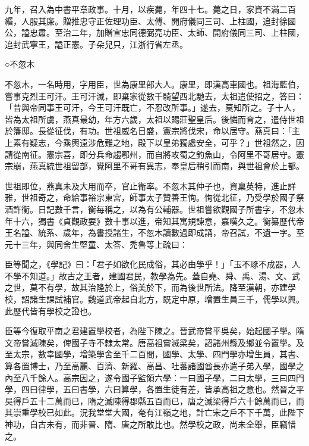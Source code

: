 \begin{pinyinscope}
 九年，召入為中書平章政事。十月，以疾薨，年四十七。薨之日，家資不滿二百緡，人服其廉。贈推忠守正佐理功臣、太傅、開府儀同三司、上柱國，追封徐國公，謚忠肅。至治二年，加贈宣忠同德弼亮功臣、太師、開府儀同三司、上柱國，追封武寧王，謚正憲。子朵兒只，江浙行省左丞。



 ○不忽木



 不忽木，一名時用，字用臣，世為康里部大人。康里，即漢高車國也。祖海藍伯，嘗事克烈王可汗。王可汗滅，即棄家從數千騎望西北馳去，太祖遣使招之，答曰：「昔與帝同事王可汗，今王可汗既亡，不忍改所事。」遂去，莫知所之。子十人，皆為太祖所虜，燕真最幼，年方六歲，太祖以賜莊聖皇后。後憐而育之，遣侍世祖於籓邸。長從征伐，有功。世祖威名日盛，憲宗將伐宋，命以居守。燕真曰：「主上素有疑志，今乘輿遠涉危難之地，殿下以皇弟獨處安全，可乎？」世祖然之，因請從南征。憲宗喜，即分兵命趨鄂州，而自將攻蜀之釣魚山，令阿里不哥居守。憲宗崩，燕真統世祖留部，覺阿里不哥有異志，奉皇后稍引而南，與世祖會於上都。



 世祖即位，燕真未及大用而卒，官止衛率。不忽木其仲子也，資稟英特，進止詳雅，世祖奇之，命給事裕宗東宮，師事太子贊善王恂。恂從北征，乃受學於國子祭酒許衡。日記數千言，衡每稱之，以為有公輔器。世祖嘗欲觀國子所書字，不忽木年十六，獨書《貞觀政要》數十事以進，帝知其寓規諫意，嘉嘆久之。衡纂歷代帝王名謚、統系、歲年，為書授諸生，不忽木讀數過即成誦，帝召試，不遺一字。至元十三年，與同舍生堅童、太答、禿魯等上疏曰：



 臣等聞之，《學記》曰：「君子如欲化民成俗，其必由學乎！」「玉不琢不成器，人不學不知道。」故古之王者，建國君民，教學為先。蓋自堯、舜、禹、湯、文、武之世，莫不有學，故其治隆於上，俗美於下，而為後世所法。降至漢朝，亦建學校，詔諸生課試補官。魏道武帝起自北方，既定中原，增置生員三千，儒學以興。此歷代皆有學校之證也。



 臣等今復取平南之君建置學校者，為陛下陳之。晉武帝嘗平吳矣，始起國子學。隋文帝嘗滅陳矣，俾國子寺不隸太常。唐高祖嘗滅梁矣，詔諸州縣及鄉並令置學。及至太宗，數幸國學，增築學舍至千二百間，國學、太學、四門學亦增生員，其書、算各置博士，乃至高麗、百濟、新羅、高昌、吐蕃諸國酋長亦遣子弟入學，國學之內至八千餘人。高宗因之，遂令國子監領六學：一曰國子學，二曰太學，三曰四門學，四曰律學，五曰書學，六曰算學，各置生徒有差，皆承高祖之意也。然晉之平吳得戶五十二萬而已，隋之滅陳得郡縣五百而已，唐之滅梁得戶六十餘萬而已，而其崇重學校已如此。況我堂堂大國，奄有江嶺之地，計亡宋之戶不下千萬，此陛下神功，自古未有，而非晉、隋、唐之所敢比也。然學校之政，尚未全舉，臣竊惜之。




\end{pinyinscope}
